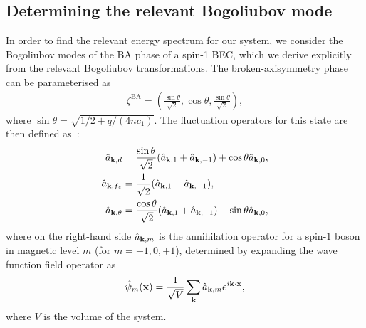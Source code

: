 \subsection{Determining the relevant Bogoliubov mode}\label{subsec: bogoliubov-modes}
In order to find the relevant energy spectrum for our system, we consider the
Bogoliubov modes of the BA phase of a spin-1 BEC, which we derive explicitly
from the relevant Bogoliubov transformations.
The broken-axisymmetry phase can be parameterised as~\cite{Uchino2010}
\begin{align}
    \zeta^\text{BA} = \left(\frac{\sin\theta}{\sqrt{2}}, \cos\theta,
    \frac{\sin\theta}{\sqrt{2}}\right),
\end{align}
where \(\sin\theta = \sqrt{1/2+q/(4nc_1)}\).
The fluctuation operators for this state are then defined as~\cite{Uchino2010}:
\begin{align}
    \hat{a}_{\vb{k}, d} &= \frac{\sin\theta}{\sqrt{2}}(\hat{a}_{\vb{k}, 1}
    + \hat{a}_{\vb{k}, -1}) + \cos\theta \hat{a}_{\vb{k}, 0}, \\
    \hat{a}_{\vb{k}, f_z} &= \frac{1}{\sqrt{2}}(\hat{a}_{\vb{k}, 1}
    - \hat{a}_{\vb{k}, -1}), \label{eq: a_k-fz}\\
    \hat{a}_{\vb{k}, \theta} &= \frac{\cos\theta}{\sqrt{2}}(\hat{a}_{\vb{k}, 1}
    + \hat{a}_{\vb{k}, -1}) - \sin\theta \hat{a}_{\vb{k}, 0},
\end{align}
where on the right-hand side \(\hat{a}_{\vb{k}, m}\) is the annihilation
operator for a spin-\(1\) boson in magnetic level \(m\) (for \(m=-1,0,+1\)),
determined by expanding the wave function field operator as
\begin{align}
    \hat{\psi}_m(\vb{x}) = \frac{1}{\sqrt{V}}\sum_{\vb{k}}
    \hat{a}_{\vb{k}, m}e^{i\vb{k}\cdot \vb{x}},
\end{align}
where \(V\) is the volume of the system.


